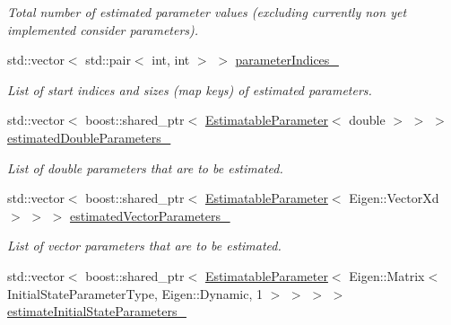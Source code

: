 \begin{DoxyCompactItemize}
\begin{DoxyCompactList}\small\item\em Total number of estimated parameter values (excluding currently non yet implemented consider parameters). \end{DoxyCompactList}\item 
std\+::vector$<$ std\+::pair$<$ int, int $>$ $>$ \hyperlink{classtudat_1_1estimatable__parameters_1_1EstimatableParameterSet_ad129dfa4a6f98530b5456c7b900ab083}{parameter\+Indices\+\_\+}
\begin{DoxyCompactList}\small\item\em List of start indices and sizes (map keys) of estimated parameters. \end{DoxyCompactList}\item 
std\+::vector$<$ boost\+::shared\+\_\+ptr$<$ \hyperlink{classtudat_1_1estimatable__parameters_1_1EstimatableParameter}{Estimatable\+Parameter}$<$ double $>$ $>$ $>$ \hyperlink{classtudat_1_1estimatable__parameters_1_1EstimatableParameterSet_a9fa4ae935451d9f0ba4529773f3cda8e}{estimated\+Double\+Parameters\+\_\+}\hypertarget{classtudat_1_1estimatable__parameters_1_1EstimatableParameterSet_a9fa4ae935451d9f0ba4529773f3cda8e}{}\label{classtudat_1_1estimatable__parameters_1_1EstimatableParameterSet_a9fa4ae935451d9f0ba4529773f3cda8e}

\begin{DoxyCompactList}\small\item\em List of double parameters that are to be estimated. \end{DoxyCompactList}\item 
std\+::vector$<$ boost\+::shared\+\_\+ptr$<$ \hyperlink{classtudat_1_1estimatable__parameters_1_1EstimatableParameter}{Estimatable\+Parameter}$<$ Eigen\+::\+Vector\+Xd $>$ $>$ $>$ \hyperlink{classtudat_1_1estimatable__parameters_1_1EstimatableParameterSet_a175434a223b24b9765495408a12fc111}{estimated\+Vector\+Parameters\+\_\+}\hypertarget{classtudat_1_1estimatable__parameters_1_1EstimatableParameterSet_a175434a223b24b9765495408a12fc111}{}\label{classtudat_1_1estimatable__parameters_1_1EstimatableParameterSet_a175434a223b24b9765495408a12fc111}

\begin{DoxyCompactList}\small\item\em List of vector parameters that are to be estimated. \end{DoxyCompactList}\item 
std\+::vector$<$ boost\+::shared\+\_\+ptr$<$ \hyperlink{classtudat_1_1estimatable__parameters_1_1EstimatableParameter}{Estimatable\+Parameter}$<$ Eigen\+::\+Matrix$<$ Initial\+State\+Parameter\+Type, Eigen\+::\+Dynamic, 1 $>$ $>$ $>$ $>$ \hyperlink{classtudat_1_1estimatable__parameters_1_1EstimatableParameterSet_aa9eebb6062ad25d000a14b4e5b081923}{estimate\+Initial\+State\+Parameters\+\_\+}\hypertarget{classtudat_1_1estimatable__parameters_1_1EstimatableParameterSet_aa9eebb6062ad25d000a14b4e5b081923}{}\label{classtudat_1_1estimatable__parameters_1_1EstimatableParameterSet_aa9eebb6062ad25d000a14b4e5b081923}


\end{DoxyCompactItemize}
